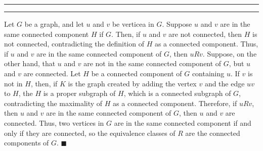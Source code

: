 \documentclass[11pt]{article}
\newcounter{questionCounter}
\newcounter{partCounter}[questionCounter]
\newenvironment{question}[2][\arabic{questionCounter}]{%
    \setcounter{partCounter}{0}%
    \vspace{.25in} \hrule \vspace{0.5em}%
        \noindent{\bf #2}%
    \vspace{0.8em} \hrule \vspace{.10in}%
    \addtocounter{questionCounter}{1}%
}{}
\begin{document}
\begin{question}{Problem 4}
Let $G$ be a graph, and let $u$ and $v$ be verticea in $G$. Suppose $u$ and
$v$ are in the same connected component $H$ if $G$. Then, if $u$ and $v$ are
not connected, then $H$ is not connected, contradicting the definition of $H$
as a connected component. Thus, if $u$ and $v$ are in the same connected
component of $G$, then $uRv$. Suppose, on the other hand, that $u$ and $v$ are
not in the same connected component of $G$, but $u$ and $v$ are connected. Let
$H$ be a connected component of $G$ containing $u$. If $v$ is not in $H$,
then, if $K$ is the graph created by adding the vertex $v$ and the edge $uv$
to $H$, the $H$ is a proper subgraph of $H$, which is a connected subgraph of
$G$, contradicting the maximality of $H$ as a connected component. Therefore,
if $uRv$, then $u$ and $v$ are in the same connected component of $G$, then
$u$ and $v$ are connected. Thus, two vertices in $G$ are in the same connected
component if and only if they are connected, so the equivalence classes of $R$
are the connected components of $G$. \qquad $\blacksquare$

\end{question}
\end{document}
